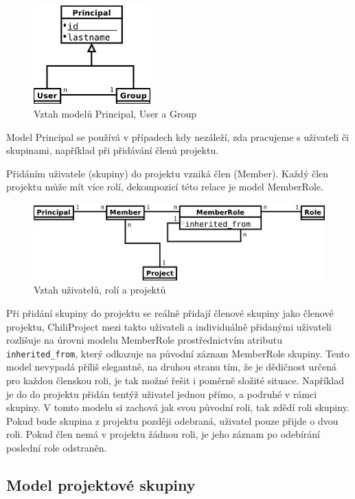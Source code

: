 \documentclass[thesis=B,czech]{FITthesis}[2012/05/02]
\begin{document}
\begin{figure}[htbp]
\centering
\includegraphics[width=0.4\textwidth]{group-er1.pdf}
\caption{Vztah modelů Principal, User a Group}
\end{figure}

Model Principal se používá v případech kdy nezáleží, zda pracujeme
s uživateli či skupinami, například při přidávání členů projektu.

Přidáním uživatele (skupiny) do projektu vzniká člen (Member). Každý
člen projektu může mít více rolí, dekompozicí této relace je model
\mbox{MemberRole}.

\begin{figure}[htbp]
\centering
\includegraphics[width=1\textwidth]{group-er2.pdf}
\caption{Vztah uživatelů, rolí a projektů}
\end{figure}

Při přidání skupiny do projektu se reálně přidají členové skupiny jako
členové projektu, ChiliProject mezi takto  uživateli a
individuálně přidanými uživateli rozlišuje na úrovni modelu MemberRole
prostřednictvím atributu \lstinline!inherited_from!, který odkazuje na
původní záznam MemberRole skupiny. Tento model nevypadá příliš
elegantně, na druhou stranu tím, že je dědičnost určená pro každou
členskou roli, je tak možné řešit i poměrně složité situace. Například
je do do projektu přidán tentýž uživatel jednou přímo, a podruhé v rámci
skupiny. V tomto modelu si zachová jak svou původní roli, tak zdědí roli
skupiny. Pokud bude skupina z projektu později odebraná, uživatel pouze
přijde o dvou roli. Pokud člen nemá v projektu žádnou roli, je jeho
záznam po odebírání poslední role odstraněn.

\subsection{Model projektové skupiny}
\end{document}
